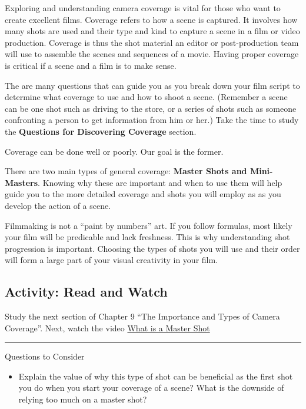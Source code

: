 \documentclass[
]{book}
\providecommand{\tightlist}{%
  \setlength{\itemsep}{0pt}\setlength{\parskip}{0pt}}
\begin{document}
Exploring and understanding camera coverage is vital for those who want to create excellent films. Coverage refers to how a scene is captured. It involves how many shots are used and their type and kind to capture a scene in a film or video production. Coverage is thus the shot material an editor or post-production team will use to assemble the scenes and sequences of a movie. Having proper coverage is critical if a scene and a film is to make sense.

The are many questions that can guide you as you break down your film script to determine what coverage to use and how to shoot a scene. (Remember a scene can be one shot such as driving to the store, or a series of shots such as someone confronting a person to get information from him or her.) Take the time to study the \textbf{Questions for Discovering Coverage} section.

Coverage can be done well or poorly. Our goal is the former.

There are two main types of general coverage: \textbf{Master Shots and Mini-Masters}. Knowing why these are important and when to use them will help guide you to the more detailed coverage and shots you will employ as as you develop the action of a scene.

Filmmaking is not a ``paint by numbers'' art. If you follow formulas, most likely your film will be predicable and lack freshness. This is why understanding shot progression is important. Choosing the types of shots you will use and their order will form a large part of your visual creativity in your film.

\hypertarget{activity-read-and-watch-1}{%
\subsection*{Activity: Read and Watch}\label{activity-read-and-watch-1}}

\begin{reflect}
Study the next section of Chapter 9 ``The Importance and Types of Camera Coverage''. Next, watch the video \href{https://www.youtube.com/watch?v=cz3nBkIa9K0}{What is a Master Shot}

\begin{center}\rule{0.5\linewidth}{0.5pt}\end{center}

{Questions to Consider}

\begin{itemize}
\tightlist
\item
  Explain the value of why this type of shot can be beneficial as the first shot you do when you start your coverage of a scene? What is the downside of relying too much on a master shot?
\end{itemize}
\end{reflect}
\end{document}
